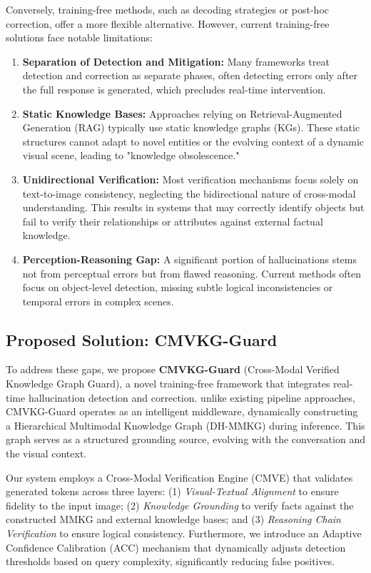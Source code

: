 Conversely, training-free methods, such as decoding strategies or post-hoc correction, offer a more flexible alternative. However, current training-free solutions face notable limitations:
\begin{enumerate}
    \item \textbf{Separation of Detection and Mitigation:} Many frameworks treat detection and correction as separate phases, often detecting errors only after the full response is generated, which precludes real-time intervention.
    \item \textbf{Static Knowledge Bases:} Approaches relying on Retrieval-Augmented Generation (RAG) typically use static knowledge graphs (KGs). These static structures cannot adapt to novel entities or the evolving context of a dynamic visual scene, leading to "knowledge obsolescence."
    \item \textbf{Unidirectional Verification:} Most verification mechanisms focus solely on text-to-image consistency, neglecting the bidirectional nature of cross-modal understanding. This results in systems that may correctly identify objects but fail to verify their relationships or attributes against external factual knowledge.
    \item \textbf{Perception-Reasoning Gap:} A significant portion of hallucinations stems not from perceptual errors but from flawed reasoning. Current methods often focus on object-level detection, missing subtle logical inconsistencies or temporal errors in complex scenes.
\end{enumerate}

\subsection{Proposed Solution: CMVKG-Guard}
To address these gaps, we propose \textbf{CMVKG-Guard} (Cross-Modal Verified Knowledge Graph Guard), a novel training-free framework that integrates real-time hallucination detection and correction. unlike existing pipeline approaches, CMVKG-Guard operates as an intelligent middleware, dynamically constructing a Hierarchical Multimodal Knowledge Graph (DH-MMKG) during inference. This graph serves as a structured grounding source, evolving with the conversation and the visual context.

Our system employs a Cross-Modal Verification Engine (CMVE) that validates generated tokens across three layers: (1) \textit{Visual-Textual Alignment} to ensure fidelity to the input image; (2) \textit{Knowledge Grounding} to verify facts against the constructed MMKG and external knowledge bases; and (3) \textit{Reasoning Chain Verification} to ensure logical consistency. Furthermore, we introduce an Adaptive Confidence Calibration (ACC) mechanism that dynamically adjusts detection thresholds based on query complexity, significantly reducing false positives.

